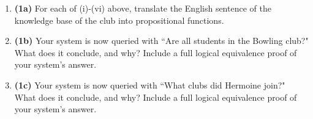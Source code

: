 \documentclass[11pt]{amsart}
\newcommand{\be}{\begin{enumerate}}
\newcommand{\ee}{\end{enumerate}}
\begin{document}
	\be
	\item[\textbf{(1a)}] For each of (i)-(vi) above, translate the English sentence of the knowledge base of the club into propositional functions.
	\item[\textbf{(1b)}] Your system is now queried with ``Are all students in the Bowling club?"  What does it conclude, and why?  Include a full logical equivalence proof of your system's answer.
	\item[\textbf{(1c)}] Your system is now queried with ``What clubs did Hermoine join?"  What does it conclude, and why?  Include a full logical equivalence proof of your system's answer.
\ee
\end{document}
